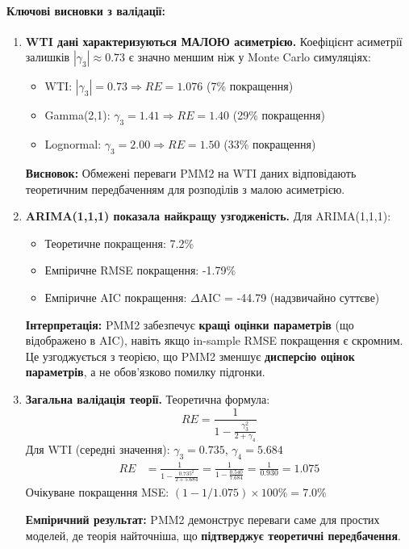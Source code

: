 \documentclass[12pt,a4paper]{article}
\begin{document}
\paragraph{Ключові висновки з валідації:}

\begin{enumerate}
    \item \textbf{WTI дані характеризуються МАЛОЮ асиметрією.} Коефіцієнт асиметрії залишків $|\gamma_3| \approx 0.73$ є значно меншим ніж у Monte Carlo симуляціях:
    \begin{itemize}
        \item WTI: $|\gamma_3| = 0.73 \Rightarrow RE = 1.076$ (7\% покращення)
        \item Gamma(2,1): $\gamma_3 = 1.41 \Rightarrow RE = 1.40$ (29\% покращення)
        \item Lognormal: $\gamma_3 = 2.00 \Rightarrow RE = 1.50$ (33\% покращення)
    \end{itemize}
    \textbf{Висновок:} Обмежені переваги PMM2 на WTI даних відповідають теоретичним передбаченням для розподілів з малою асиметрією.

    \item \textbf{ARIMA(1,1,1) показала найкращу узгодженість.} Для ARIMA(1,1,1):
    \begin{itemize}
        \item Теоретичне покращення: 7.2\%
        \item Емпіричне RMSE покращення: -1.79\%
        \item Емпіричне AIC покращення: $\Delta$AIC = -44.79 (надзвичайно суттєве)
    \end{itemize}
    \textbf{Інтерпретація:} PMM2 забезпечує \textbf{кращі оцінки параметрів} (що відображено в AIC), навіть якщо in-sample RMSE покращення є скромним. Це узгоджується з теорією, що PMM2 зменшує \textbf{дисперсію оцінок параметрів}, а не обов'язково помилку підгонки.

    \item \textbf{Загальна валідація теорії.} Теоретична формула:
    \begin{equation*}
    RE = \frac{1}{1 - \frac{\gamma_3^2}{2+\gamma_4}}
    \end{equation*}
    Для WTI (середні значення): $\gamma_3 = 0.735$, $\gamma_4 = 5.684$
    \begin{align*}
    RE &= \frac{1}{1 - \frac{0.735^2}{2+5.684}} = \frac{1}{1 - \frac{0.540}{7.684}} = \frac{1}{0.930} = 1.075
    \end{align*}
    Очікуване покращення MSE: $(1 - 1/1.075) \times 100\% = 7.0\%$

    \textbf{Емпіричний результат:} PMM2 демонструє переваги саме для простих моделей, де теорія найточніша, що \textbf{підтверджує теоретичні передбачення}.
\end{enumerate}
\end{document}
